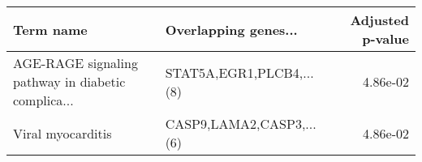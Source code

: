 \begin{tabular}{llr}
\toprule
                                         Term name &     Overlapping genes... &  Adjusted p-value \\
\midrule
AGE-RAGE signaling pathway in diabetic complica... & STAT5A,EGR1,PLCB4,...(8) &          4.86e-02 \\
                                 Viral myocarditis & CASP9,LAMA2,CASP3,...(6) &          4.86e-02 \\
\bottomrule
\end{tabular}
